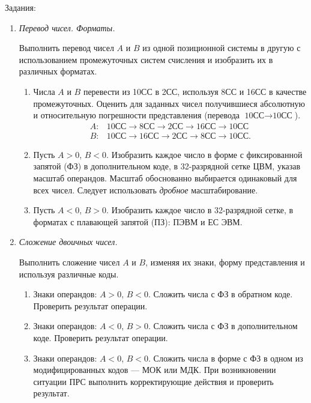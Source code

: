 Задания:
\begin{enumerate}
    \item \emph{Перевод чисел. Форматы.}
    
    Выполнить перевод чисел $A$ и $B$ из одной позиционной системы в другую с использованием промежуточных систем счисления и изобразить их в различных форматах.
    \begin{enumerate}
        \item Числа $A$ и $B$ перевести из 10СС в 2СС, используя 8СС и 16СС в качестве промежуточных. Оценить для заданных чисел получившиеся абсолютную и относительную погрешности представления (перевода $\text{10СС}\to\text{10СС}$).
        \begin{align*}
            A: & \text{10СС}\to\text{8СС}\to\text{2СС}\to\text{16СС}\to\text{10СС}\\
            B: & \text{10СС}\to\text{16СС}\to\text{2СС}\to\text{8СС}\to\text{10СС}.
        \end{align*}
        
        \item Пусть $A>0$, $B<0$. Изобразить каждое число в форме с фиксированной запятой (ФЗ) в дополнительном коде, в 32-разрядной сетке ЦВМ, указав масштаб операндов. Масштаб обоснованно выбирается одинаковый для всех чисел. Следует использовать \emph{дробное} масштабирование.
        
        \item Пусть $A<0$, $B>0$. Изобразить каждое число в 32-разрядной сетке, в форматах с плавающей запятой (ПЗ): ПЭВМ и ЕС ЭВМ.
    \end{enumerate}

    \item \emph{Сложение двоичных чисел.}
    
    Выполнить сложение чисел $A$ и $B$, изменяя их знаки, форму представления и используя различные коды.
    \begin{enumerate}
        \item Знаки операндов: $A>0$, $B<0$. Сложить числа с ФЗ в обратном коде. Проверить результат операции.
        
        \item Знаки операндов: $A<0$, $B>0$. Сложить числа с ФЗ в дополнительном коде. Проверить результат операции.
        
        \item Знаки операндов: $A<0$, $B<0$. Сложить числа в форме с ФЗ в одном из модифицированных кодов --- МОК или МДК. При возникновении ситуации ПРС выполнить корректирующие действия и проверить результат.
        

\end{enumerate}
\end{enumerate}
